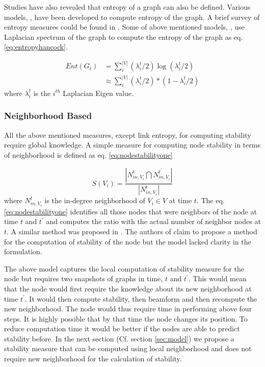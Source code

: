 \documentclass[preprint, twocolumn,5p]{elsarticle}
\begin{document}
        Studies have also revealed that entropy of a graph can also be defined. Various models, \cite{Shetty2005,Lu2008,Volchenkov2007, Riis2007,LinHan2011,Zhao2011}, have been developed to compute entropy of the graph. A brief survey of entropy measures could be found in \cite{Zayani2011, Dehmer2011}. Some of above mentioned models, \cite{LinHan2011}, use Laplacian spectrum of the graph to compute the entropy of the graph as eq. \ref{eq:entropyhancock}.

        \begin{align}\label{eq:entropyhancock}
         Ent(G_{t}) &= \sum_{i}^{|V|}(\lambda_{i}^{t}/2)\log(\lambda_{i}^{t}/2)\\ \nonumber
         &\approx \sum_{i}^{|V|}(\lambda_{i}^{t}/2)*(1-\lambda_{i}^{t}/2)
        \end{align}
        where $\lambda_{i}^{t}$ is the $i^{th}$ Laplacian Eigen value.

        \subsubsection{Neighborhood Based}\label{subsubsec:neighborhood based}
        All the above mentioned measures, except link entropy, for computing stability require global knowledge. A simple measure for computing node stability in terms of neighborhood is defined as eq. \ref{eq:nodestabilityone}

        \begin{equation}\label{eq:nodestabilityone}
        S(V_{i}) = \frac{|N_{in,V_{i}}^{t}\bigcap N_{in,V_{i}}^{t^{'}}|}{|N_{in,V_{i}}^{t}|}
        \end{equation}
        where $N_{in,V_{i}}^{t}$ is the in-degree neighborhood of $V_{i}\in V$ at time $t$. The eq. \ref{eq:nodestabilityone} identifies all those nodes that were neighbors of the node at time $t$ and $t^{'}$ and computes the ratio with the actual number of neighbor nodes at $t$. A similar method was proposed in \cite{Brust2007}. The authors of \cite{Brust2007} claim to propose a method for the computation of stability of the node but the model lacked clarity in the formulation.

        The above model captures the local computation of stability measure for the node but requires two snapshots of graphs in time, $t$ and $t^{'}$. This would mean that the node would first require the knowledge about its new neighborhood at time $t^{'}$. It would then compute stability, then beamform and then recompute the new neighborhood. The node would thus require time in performing above four steps. It is highly possible that by that time the node changes its position. To reduce computation time it would be better if the nodes are able to predict stability before. In the next section (Cf. section \ref{sec:model}) we propose a stability measure that can be computed using local neighborhood and does not require new neighborhood for the calculation of stability.
\end{document}

